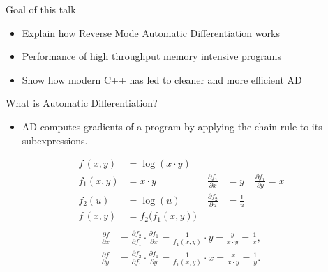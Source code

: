 \documentclass[dvipsnames]{beamer}
\newcommand{\fracp}[2]{\frac{\partial #1}{\partial #2}}
\begin{document}
\begin{frame}{Goal of this talk}
\begin{itemize}
    \item Explain how Reverse Mode Automatic Differentiation works
    \item Performance of high throughput memory intensive programs
    \item Show how modern C++ has led to cleaner and more efficient AD
\end{itemize}
\end{frame}


\begin{frame}[fragile]{What is Automatic Differentiation?}
\begin{itemize}
  \item AD computes gradients of a program by applying the chain rule to its subexpressions.
\end{itemize}
\begin{align*}
f\,(x, y) &= \log(x\cdot y)\\
f_1(x, y) &= x \cdot y &\; \fracp{f_1}{x} &= y &\: \fracp{f_1}{y} = x\\[2pt]
f_2(u) &= \log(u) &\; \fracp{f_2}{u} &= \frac{1}{u}&\\[2pt]
f\,(x,y) &= f_2\!\big(f_1(x,y)\big) \\
\end{align*}
\pause
\vspace{-13mm}
\begin{align*}
\fracp{f}{x}
  &= \fracp{f_2}{f_1} \cdot \fracp{f_1}{x}
   = \frac{1}{f_1(x, y)}\cdot y
   = \frac{y}{x\cdot y}
   = \frac{1}{x},\\[4pt]
\fracp{f}{y}
  &= \fracp{f_2}{f_1} \cdot \fracp{f_1}{y}
   = \frac{1}{f_1(x, y)}\cdot x
   = \frac{x}{x\cdot y}
   = \frac{1}{y}.
\end{align*}
\end{frame}
\end{document}
